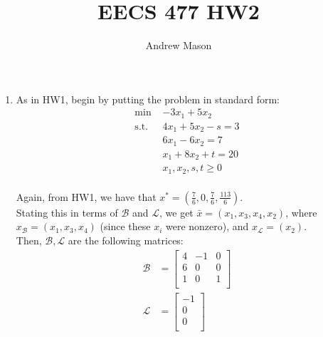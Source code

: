\documentclass[12pt]{article}
\title{EECS 477 HW2}
\author{Andrew Mason}
\begin{document}
\maketitle

\begin{enumerate}
  \item
    As in HW1, begin by putting the problem in standard form:\\

    \begin{equation}
      \begin{split}
        \text{min }& -3x_1 + 5x_2 \\
        \text{s.t. }& 4x_1 + 5x_2 - s = 3 \\
        & 6x_1 - 6x_2 = 7 \\
        & x_1 + 8x_2 + t = 20 \\
        & x_1, x_2, s, t\geq 0 \\
      \end{split}
    \end{equation}

    Again, from HW1, we have that
    $x^*=(\frac{7}{6},0,\frac{7}{6},\frac{113}{6})$.\\

    Stating this in terms of $\mathcal{B}$ and $\mathcal{L}$, we get
    $\bar{x}=(x_1,x_3,x_4,x_2)$, where $x_\mathcal{B}=(x_1,x_3,x_4)$ (since
    these $x_i$ were nonzero), and $x_\mathcal{L}=(x_2)$.\\

    Then, $\mathcal{B},\mathcal{L}$ are the following matrices:\\
    \begin{equation}
      \begin{split}
        \mathcal{B}&=
          \begin{bmatrix*}
            4 & -1 & 0 \\
            6 & 0 & 0 \\
            1 & 0 & 1 \\
          \end{bmatrix*} \\
        \mathcal{L}&=
          \begin{bmatrix*}
            -1 \\
            0 \\
            0 \\
          \end{bmatrix*}
      \end{split}
    \end{equation}


\end{enumerate}
\end{document}
